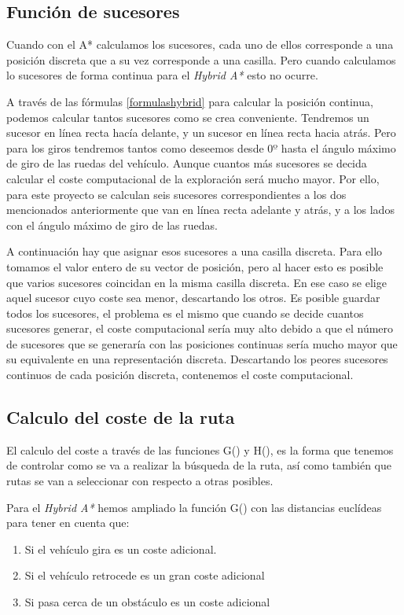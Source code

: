 \subsection{Función de sucesores}
Cuando con el A* calculamos los sucesores, cada uno de ellos corresponde a una posición discreta que a su vez corresponde a una casilla. Pero cuando calculamos lo sucesores de forma continua para el \textit{Hybrid A*} esto no ocurre.

A través de las fórmulas \ref{formulashybrid} para calcular la posición continua, podemos calcular tantos sucesores como se crea conveniente. Tendremos un sucesor en línea recta hacía delante, y un sucesor en línea recta hacia atrás. Pero para los giros tendremos tantos como deseemos desde $0º$ hasta el ángulo máximo de giro de las ruedas del vehículo. Aunque cuantos más sucesores se decida calcular el coste computacional de la exploración será mucho mayor. Por ello, para este proyecto se calculan seis sucesores correspondientes a los dos mencionados anteriormente que van en línea recta adelante y atrás, y a los lados con el ángulo máximo de giro de las ruedas.

A continuación hay que asignar esos sucesores a una casilla discreta. Para ello tomamos el valor entero de su vector de posición, pero al hacer esto es posible que varios sucesores coincidan en la misma casilla discreta. En ese caso se elige aquel sucesor cuyo coste sea menor, descartando los otros. Es posible guardar todos los sucesores, el problema es el mismo que cuando se decide cuantos sucesores generar, el coste computacional sería muy alto debido a que el número de sucesores que se generaría con las posiciones continuas sería mucho mayor que su equivalente en una representación discreta. Descartando los peores sucesores continuos de cada posición discreta, contenemos el coste computacional.

\subsection{Calculo del coste de la ruta} \label{hybridcoste}
El calculo del coste a través de las funciones G() y H(), es la forma que tenemos de controlar como se va a realizar la búsqueda de la ruta, así como también que rutas se van a seleccionar con respecto a otras posibles.

Para el \textit{Hybrid A*} hemos ampliado la función G() con las distancias euclídeas para tener en cuenta que:
\begin{enumerate}
\item Si el vehículo gira es un coste adicional.
\item Si el vehículo retrocede es un gran coste adicional
\item Si pasa cerca de un obstáculo es un coste adicional
\end{enumerate}


